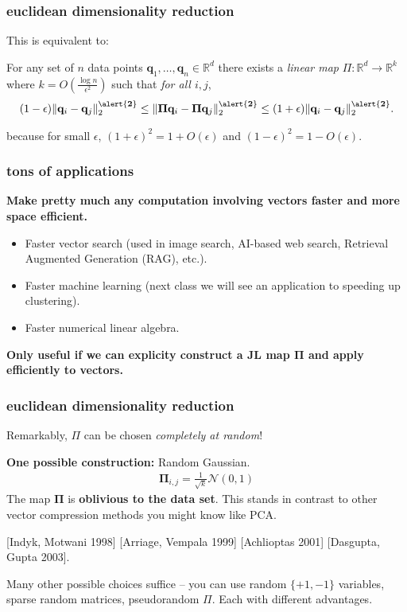 \documentclass[compress]{beamer}
\newcommand{\bs}[1]{\boldsymbol{#1}}
\newcommand{\bv}[1]{\mathbf{#1}}
\newcommand{\R}{\mathbb{R}}
\begin{document}
\begin{frame}
	\frametitle{euclidean dimensionality reduction}
	This is equivalent to: 
	\begin{lemma}
		For any set of $n$ data points $\bv{q}_1,\ldots, \bv{q}_n \in \R^d$ there exists a \emph{linear map} $\Pi: \R^d \rightarrow \R^k$ where $k = O\left(\frac{\log n}{\epsilon^2}\right)$ such that \emph{for all $i,j$},
		\begin{align*}
			(1-\epsilon)\|\bv{q}_i - \bv{q}_j\|_2^{\mathbf{\alert{2}}} \leq \|\bs{\Pi}\bv{q}_i - \bs{\Pi}\bv{q}_j\|_2^{\mathbf{\alert{2}}} \leq (1+\epsilon)\|\bv{q}_i - \bv{q}_j\|_2^{\mathbf{\alert{2}}}.
		\end{align*}
	\end{lemma}
	because for small $\epsilon$, $(1+\epsilon)^2 = 1 + O(\epsilon)$ and $(1-\epsilon)^2 = 1 - O(\epsilon)$.
\end{frame}

\begin{frame}
	\frametitle{tons of applications}
	\textbf{Make pretty much any computation involving vectors faster and more space efficient.}
	\begin{itemize}
		\item Faster vector search (used in image search, AI-based web search, Retrieval Augmented Generation (RAG), etc.).
		\item Faster machine learning (next class we will see an application to speeding up clustering).
		\item Faster numerical linear algebra. 
	\end{itemize}
	\begin{center}
		\alert{\textbf{Only useful if we can explicity construct a JL map $\bs{\Pi}$ and apply efficiently to vectors.}}
	\end{center}
\end{frame}

\begin{frame}
	\frametitle{euclidean dimensionality reduction}
	\begin{center}
		Remarkably, $\Pi$ can be chosen \emph{completely at random}!
	\end{center}
	\textbf{One possible construction:} Random Gaussian.
	\begin{align*}
		\bs{\Pi}_{i,j} = \frac{1}{\sqrt{k}} \mathcal{N}(0,1)
	\end{align*}
	The map $\bs{\Pi}$ is \textbf{\alert{oblivious to the data set}}. This stands in contrast to other vector compression methods you might know like PCA.
	
	[Indyk, Motwani 1998] [Arriage, Vempala 1999] [Achlioptas 2001] [Dasgupta, Gupta 2003].
	
	Many other possible choices suffice -- you can use random $\{+1,-1\}$ variables, sparse random matrices, pseudorandom $\Pi$. Each with different advantages. 
\end{frame}
\end{document}
